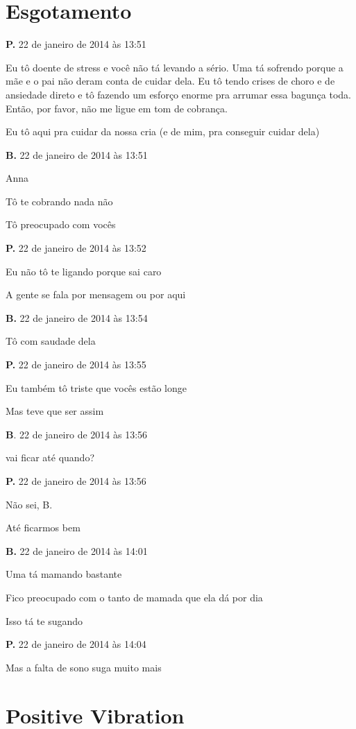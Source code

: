 \chapter{Esgotamento}

{\parindent0pt\parskip1pt\raggedright
\textbf{P.} 22 de janeiro de 2014 às 13:51

Eu tô doente de stress e você não tá levando a sério. Uma tá sofrendo
porque a mãe e o pai não deram conta de cuidar dela. Eu tô tendo crises
de choro e de ansiedade direto e tô fazendo um esforço enorme pra
arrumar essa bagunça toda. Então, por favor, não me ligue em tom de
cobrança.

Eu tô aqui pra cuidar da nossa cria (e de mim, pra conseguir cuidar
dela)

\textbf{B.} 22 de janeiro de 2014 às 13:51

Anna

Tô te cobrando nada não

Tô preocupado com vocês

\textbf{P.} 22 de janeiro de 2014 às 13:52

Eu não tô te ligando porque sai caro

A gente se fala por mensagem ou por aqui

\textbf{B.} 22 de janeiro de 2014 às 13:54

Tô com saudade dela

\textbf{P.} 22 de janeiro de 2014 às 13:55

Eu também tô triste que vocês estão longe

Mas teve que ser assim

\textbf{B}. 22 de janeiro de 2014 às 13:56

vai ficar até quando?

\textbf{P.} 22 de janeiro de 2014 às 13:56

Não sei, B.

Até ficarmos bem

\textbf{B.} 22 de janeiro de 2014 às 14:01

Uma tá mamando bastante

Fico preocupado com o tanto de mamada que ela dá por dia

Isso tá te sugando

\textbf{P.} 22 de janeiro de 2014 às 14:04

Mas a falta de sono suga muito mais
}

\chapter{Positive Vibration}

